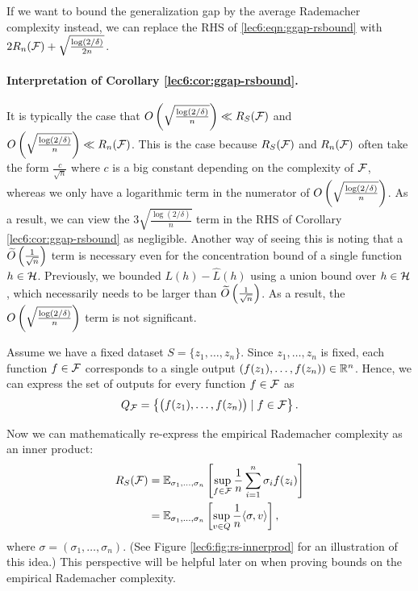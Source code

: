 \begin{remark}
If we want to bound the generalization gap by the average Rademacher complexity instead, we can replace the RHS of \eqref{lec6:eqn:ggap-rsbound} with $2R_n(\mathcal F) + \sqrt{\frac{\log(2/\delta)}{2n}}$.
\end{remark}

\paragraph{Interpretation of  Corollary \ref{lec6:cor:ggap-rsbound}.}
\sloppy It is typically the case that $O\left(\sqrt{\frac{\log (2/\delta)}{n}}\right) \ll R_S(\mathcal F)$ and $O\left(\sqrt{\frac{\log (2/\delta)}{n}}\right) \ll R_n(\mathcal F)$. This is the case because $R_S(\mathcal F)$ and $R_n(\mathcal F)$ often take the form $\frac{c}{\sqrt{n}}$ where $c$ is a big constant depending on the complexity of $\mathcal F$, whereas we only have a logarithmic term in the numerator of $O\left(\sqrt{\frac{\log (2/\delta)}{n}}\right)$. As a result, we can view the $3\sqrt{\frac{\log (2/\delta)}{n}}$ term in the RHS of Corollary \ref{lec6:cor:ggap-rsbound} as negligible. Another way of seeing this is noting that a $\widetilde{O} \left( \frac{1}{\sqrt{n}} \right)$ term is necessary even for the concentration bound of a single function $h\in\mathcal H$. Previously, we bounded $L(h)-\hat{L}(h)$ using a union bound over $h\in\mathcal H$, which necessarily needs to be larger than $\widetilde{O} \left(\frac{1}{\sqrt{n}} \right)$. As a result, the $O\left(\sqrt{\frac{\log (2/\delta)}{n}}\right)$ term is not significant.

Assume we have a fixed dataset $S = \{z_1, \dots, z_n\}$. Since $z_1,\dots, z_n$ is fixed, each function $f\in\mathcal F$ corresponds to a single output $(f(z_1),\dots,f(z_n))\in \mathbb R^n$. Hence, we can express the set of outputs for every function $f\in\mathcal F$ as
\begin{align}
    Q_\mathcal F = \left\{ \begin{pmatrix}f(z_1), \dots, f(z_n) \end{pmatrix} \mid f\in\mathcal F \right\}.
\end{align}

Now we can mathematically re-express the empirical Rademacher complexity as an inner product:
\begin{align}
R_S(\mathcal F) &= \mathbb{E}_{\sigma_1,\dots, \sigma_n} \left[ \sup_{f\in \mathcal F} \frac{1}{n} \sum^n_{i=1} \sigma_i f(z_i) \right] \\
&= \mathbb{E}_{\sigma_1,\dots, \sigma_n} \left[ \sup_{v\in Q} \frac{1}{n}\langle\sigma, v\rangle \right],
\end{align}
where $\sigma=(\sigma_1,\dots,\sigma_n)$. (See Figure \ref{lec6:fig:rs-innerprod} for an illustration of this idea.) This perspective will be helpful later on when proving bounds on the empirical Rademacher complexity.


